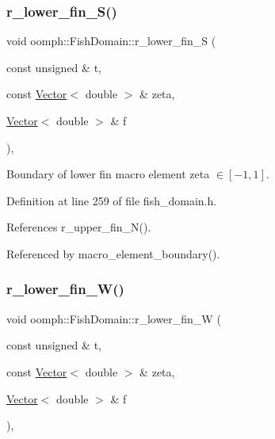 \subsubsection{\texorpdfstring{r\+\_\+lower\+\_\+fin\+\_\+\+S()}{r\_lower\_fin\_S()}}
{\footnotesize\ttfamily void oomph\+::\+Fish\+Domain\+::r\+\_\+lower\+\_\+fin\+\_\+S (\begin{DoxyParamCaption}\item[{const unsigned \&}]{t,  }\item[{const \hyperlink{classoomph_1_1Vector}{Vector}$<$ double $>$ \&}]{zeta,  }\item[{\hyperlink{classoomph_1_1Vector}{Vector}$<$ double $>$ \&}]{f }\end{DoxyParamCaption})\hspace{0.3cm}{\ttfamily [inline]}, {\ttfamily [private]}}



Boundary of lower fin macro element zeta $ \in [-1,1] $. 



Definition at line 259 of file fish\+\_\+domain.\+h.



References r\+\_\+upper\+\_\+fin\+\_\+\+N().



Referenced by macro\+\_\+element\+\_\+boundary().

\mbox{\label{classoomph_1_1FishDomain_aaf5f3eb1842dc9d7e3f51d4b727632f9}} 
\subsubsection{\texorpdfstring{r\+\_\+lower\+\_\+fin\+\_\+\+W()}{r\_lower\_fin\_W()}}
{\footnotesize\ttfamily void oomph\+::\+Fish\+Domain\+::r\+\_\+lower\+\_\+fin\+\_\+W (\begin{DoxyParamCaption}\item[{const unsigned \&}]{t,  }\item[{const \hyperlink{classoomph_1_1Vector}{Vector}$<$ double $>$ \&}]{zeta,  }\item[{\hyperlink{classoomph_1_1Vector}{Vector}$<$ double $>$ \&}]{f }\end{DoxyParamCaption})\hspace{0.3cm}{\ttfamily [inline]}, {\ttfamily [private]}}



